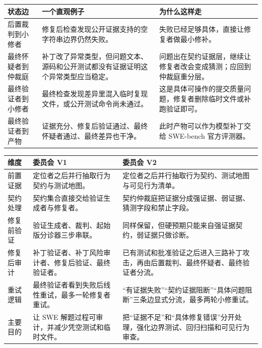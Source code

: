 \documentclass[UTF8,a4paper,11pt]{ctexart}
\begin{document}
\begin{center}
{\small
\setlength{\tabcolsep}{3pt}
\begin{tabular}{L{3.4cm} L{4.7cm} L{5.8cm}}
\toprule
状态边 & 一个直观例子 & 为什么这样走 \\
\midrule
后置裁判到小修者 & 修复后检查发现公开证据支持的空字符串边界仍然失败。 & 失败已经足够具体，直接让修复者做最小修补。 \\
最终怀疑者到仲裁庭 & 补丁改了异常类型，但问题文本、源码和公开测试都没有证据证明这个异常类型应当稳定。 & 问题出在契约证据层，继续让修复者改会变成猜测；应回到仲裁庭重分层。 \\
最终验证者到小修者 & 最终检查发现差异里混入临时复现文件，或公开测试命令尚未通过。 & 这是具体可操作的提交质量问题，修复者删除临时文件或补跑验证即可。 \\
最终验证者到产物 & 证据充分、修复后验证通过、最终怀疑者通过、最终差异也干净。 & 此时产物可以作为模型补丁交给 SWE-bench 官方评测器。 \\
\bottomrule
\end{tabular}
}
\end{center}

\begin{center}
{\small
\setlength{\tabcolsep}{3pt}
\begin{tabular}{L{3.0cm} L{5.4cm} L{6.0cm}}
\toprule
维度 & 委员会 V1 & 委员会 V2 \\
\midrule
前置证据 & 定位者之后并行抽取行为契约与测试地图。 & 定位者之后并行抽取行为契约、测试地图与可见行为清单。 \\
契约处理 & 契约集合直接交给验证生成者与修复者。 & 契约仲裁庭把证据分成强证据、弱证据、猜测字段和禁止字段。 \\
修复前验证 & 验证生成者、裁判、起始版分诊器三步串联。 & 同样保留，但硬预期只能来自强证据契约，弱证据只做诊断。 \\
修复后审计 & 补丁验证者、补丁风险审计者、修复后验证、最终验证者。 & 已有测试和批准验证之后进入三路补丁攻击，再由后置裁判、最终怀疑者、最终验证者分流。 \\
重试逻辑 & 最终验证者看到失败后线性重试，最多一轮修复者重试。 & “有证据失败”“契约证据阻断”“具体问题阻断”三条边显式分流，最多两轮小修重试。 \\
主要目的 & 让 SWE 解题过程可审计，并减少凭空测试和临时文件。 & 把“证据不足”和“具体修复错误”分开处理，强化边界测试、回归扫描和可见行为审查。 \\
\bottomrule
\end{tabular}
}
\end{center}
\end{document}
